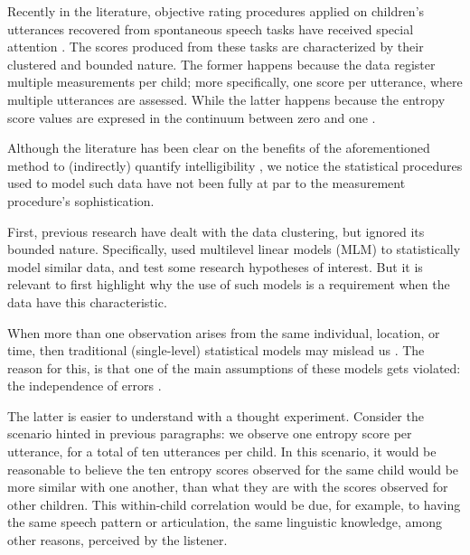 Recently in the literature, objective rating procedures applied on children's utterances recovered from spontaneous speech tasks have received special attention \citep{Boonen_et_al_2021, Hustad_et_al_2020}. The scores produced from these tasks are characterized by their clustered and bounded nature. The former happens because the data register multiple measurements per child; more specifically, one score per utterance, where multiple utterances are assessed. While the latter happens because the entropy score values are expresed in the continuum between zero and one \citep{Shannon_1948}.

\begin{comment}	
	
	Moreover, the previous advantages are further emphasized by the use of stimuli gathered from spontaneous speech tasks, as they have a greater level of ecological validity, especially compared to contextualized utterances or reading at loud tasks \citep{Flipsen_2006, Ertmer_2011}.
	
\end{comment}

Although the literature has been clear on the benefits of the aforementioned method to (indirectly) quantify intelligibility \citep{Boonen_et_al_2020, Boonen_et_al_2021, Hustad_et_al_2020}, we notice the statistical procedures used to model such data have not been fully at par to the measurement procedure's sophistication.

First, previous research have dealt with the data clustering, but ignored its bounded nature. Specifically, \cite{Boonen_et_al_2021} used multilevel linear models (MLM) to statistically model similar data, and test some research hypotheses of interest. But it is relevant to first highlight why the use of such models is a requirement when the data have this characteristic.

When more than one observation arises from the same individual, location, or time, then traditional (single-level) statistical models may mislead us \citep{McElreath_2020}. The reason for this, is that one of the main assumptions of these models gets violated: the independence of errors \citep{Finch_et_al_2019}.

The latter is easier to understand with a thought experiment. Consider the scenario hinted in previous paragraphs: we observe one entropy score per utterance, for a total of ten utterances per child. In this scenario, it would be reasonable to believe the ten entropy scores observed for the same child would be more similar with one another, than what they are with the scores observed for other children. This within-child correlation would be due, for example, to having the same speech pattern or articulation, the same linguistic knowledge, among other reasons, perceived by the listener.

